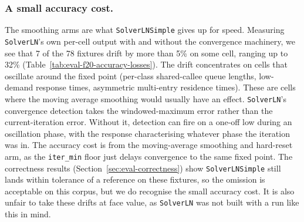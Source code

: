 \subsubsection*{A small accuracy cost.} 
The smoothing arms are what \texttt{SolverLNSimple} gives up for speed. Measuring \texttt{SolverLN}'s own per-cell output with and without the convergence machinery, we see that 7 of the 78 fixtures drift by more than 5\% on some cell, ranging up to 32\% (Table~\ref{tab:eval-f20-accuracy-losses}). The drift concentrates on cells that oscillate around the fixed point (per-class shared-callee queue lengths, low-demand response times, asymmetric multi-entry residence times). These are cells where the moving average smoothing would usually have an effect. \texttt{SolverLN}'s convergence detection takes the windowed-maximum error rather than the current-iteration error. Without it, detection can fire on a one-off low during an oscillation phase, with the response characterising whatever phase the iteration was in. The accuracy cost is from the moving-average smoothing and hard-reset arm, as the \texttt{iter\_min} floor just delays convergence to the same fixed point. The correctness results (Section~\ref{sec:eval-correctness}) show \texttt{SolverLNSimple} still lands within tolerance of a reference on these fixtures, so the omission is acceptable on this corpus, but we do recognise the small accuracy cost. It is also unfair to take these drifts at face value, as \texttt{SolverLN} was not built with a run like this in mind.


